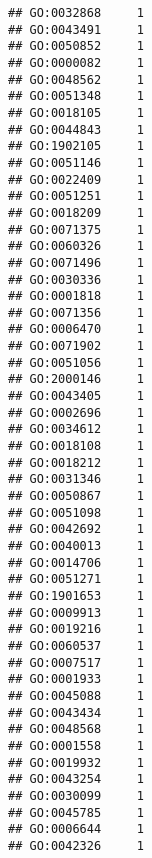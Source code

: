 \documentclass[
]{article}
\begin{document}
\begin{verbatim}
## GO:0032868     1
## GO:0043491     1
## GO:0050852     1
## GO:0000082     1
## GO:0048562     1
## GO:0051348     1
## GO:0018105     1
## GO:0044843     1
## GO:1902105     1
## GO:0051146     1
## GO:0022409     1
## GO:0051251     1
## GO:0018209     1
## GO:0071375     1
## GO:0060326     1
## GO:0071496     1
## GO:0030336     1
## GO:0001818     1
## GO:0071356     1
## GO:0006470     1
## GO:0071902     1
## GO:0051056     1
## GO:2000146     1
## GO:0043405     1
## GO:0002696     1
## GO:0034612     1
## GO:0018108     1
## GO:0018212     1
## GO:0031346     1
## GO:0050867     1
## GO:0051098     1
## GO:0042692     1
## GO:0040013     1
## GO:0014706     1
## GO:0051271     1
## GO:1901653     1
## GO:0009913     1
## GO:0019216     1
## GO:0060537     1
## GO:0007517     1
## GO:0001933     1
## GO:0045088     1
## GO:0043434     1
## GO:0048568     1
## GO:0001558     1
## GO:0019932     1
## GO:0043254     1
## GO:0030099     1
## GO:0045785     1
## GO:0006644     1
## GO:0042326     1
\end{verbatim}
\end{document}
